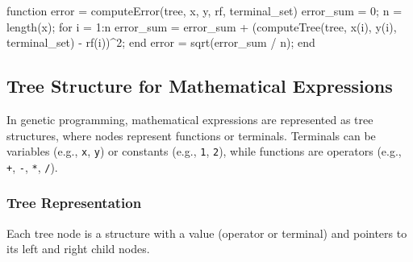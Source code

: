 \documentclass[
  letterpaper,
  DIV=11,
  numbers=noendperiod]{scrartcl}
\newenvironment{Shaded}{\begin{snugshade}}{\end{snugshade}}
\newcommand{\FloatTok}[1]{\textcolor[rgb]{0.68,0.00,0.00}{#1}}
\newcommand{\KeywordTok}[1]{\textcolor[rgb]{0.00,0.23,0.31}{#1}}
\newcommand{\NormalTok}[1]{\textcolor[rgb]{0.00,0.23,0.31}{#1}}
\newcommand{\OperatorTok}[1]{\textcolor[rgb]{0.37,0.37,0.37}{#1}}
\newcommand{\VariableTok}[1]{\textcolor[rgb]{0.07,0.07,0.07}{#1}}
\begin{document}
\begin{Shaded}
\begin{Highlighting}[]
\KeywordTok{function} \VariableTok{error} \OperatorTok{=} \VariableTok{computeError}\NormalTok{(}\VariableTok{tree}\OperatorTok{,} \VariableTok{x}\OperatorTok{,} \VariableTok{y}\OperatorTok{,} \VariableTok{rf}\OperatorTok{,} \VariableTok{terminal\_set}\NormalTok{)}
    \VariableTok{error\_sum} \OperatorTok{=} \FloatTok{0}\OperatorTok{;}
    \VariableTok{n} \OperatorTok{=} \VariableTok{length}\NormalTok{(}\VariableTok{x}\NormalTok{)}\OperatorTok{;}
    \KeywordTok{for} \VariableTok{i} \OperatorTok{=} \FloatTok{1}\OperatorTok{:}\VariableTok{n}
        \VariableTok{error\_sum} \OperatorTok{=} \VariableTok{error\_sum} \OperatorTok{+}\NormalTok{ (}\VariableTok{computeTree}\NormalTok{(}\VariableTok{tree}\OperatorTok{,} \VariableTok{x}\NormalTok{(}\VariableTok{i}\NormalTok{)}\OperatorTok{,} \VariableTok{y}\NormalTok{(}\VariableTok{i}\NormalTok{)}\OperatorTok{,} \VariableTok{terminal\_set}\NormalTok{) }\OperatorTok{{-}} \VariableTok{rf}\NormalTok{(}\VariableTok{i}\NormalTok{))}\OperatorTok{\^{}}\FloatTok{2}\OperatorTok{;}
    \KeywordTok{end}
    \VariableTok{error} \OperatorTok{=} \VariableTok{sqrt}\NormalTok{(}\VariableTok{error\_sum} \OperatorTok{/} \VariableTok{n}\NormalTok{)}\OperatorTok{;}
\KeywordTok{end}
\end{Highlighting}
\end{Shaded}

\subsection{Tree Structure for Mathematical
Expressions}\label{tree-structure-for-mathematical-expressions}

In genetic programming, mathematical expressions are represented as tree
structures, where nodes represent functions or terminals. Terminals can
be variables (e.g., \texttt{x}, \texttt{y}) or constants (e.g.,
\texttt{1}, \texttt{2}), while functions are operators (e.g.,
\texttt{+}, \texttt{-}, \texttt{*}, \texttt{/}).

\subsubsection{Tree Representation}\label{tree-representation}

Each tree node is a structure with a value (operator or terminal) and
pointers to its left and right child nodes.
\end{document}
